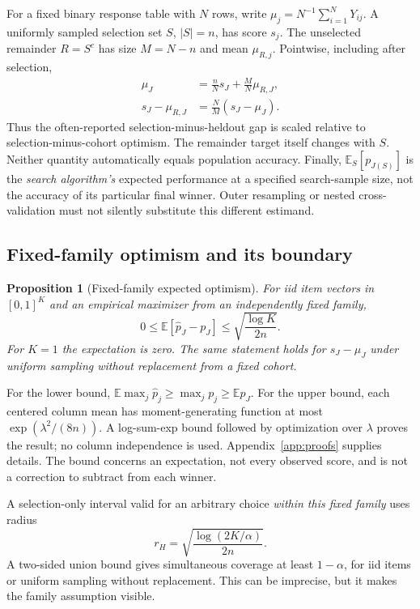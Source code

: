 \documentclass{article}
\newtheorem{proposition}{Proposition}
\newcommand{\E}{\mathbb E}
\begin{document}
For a fixed binary response table with $N$ rows, write $\mu_j=N^{-1}\sum_{i=1}^N Y_{ij}$. A uniformly sampled selection set $S$, $|S|=n$, has score $s_j$. The unselected remainder $R=S^c$ has size $M=N-n$ and mean $\mu_{R,j}$. Pointwise, including after selection,
\begin{align}
 \mu_J&=\frac nN s_J+\frac MN\mu_{R,J},\label{eq:mapping}\\
 s_J-\mu_{R,J}&=\frac NM(s_J-\mu_J).\label{eq:gap}
\end{align}
Thus the often-reported selection-minus-heldout gap is scaled relative to selection-minus-cohort optimism. The remainder target itself changes with $S$. Neither quantity automatically equals population accuracy. Finally, $\E_S[p_{J(S)}]$ is the \emph{search algorithm's} expected performance at a specified search-sample size, not the accuracy of its particular final winner. Outer resampling or nested cross-validation must not silently substitute this different estimand.

\subsection{Fixed-family optimism and its boundary}
\begin{proposition}[Fixed-family expected optimism]\label{prop:optimism}
For iid item vectors in $[0,1]^K$ and an empirical maximizer from an independently fixed family,
\[
0\leq\E[\widehat p_J-p_J]\leq\sqrt{\frac{\log K}{2n}}.
\]
For $K=1$ the expectation is zero. The same statement holds for $s_J-\mu_J$ under uniform sampling without replacement from a fixed cohort.
\end{proposition}
For the lower bound, $\E\max_j\widehat p_j\geq\max_jp_j\geq\E p_J$. For the upper bound, each centered column mean has moment-generating function at most $\exp(\lambda^2/(8n))$. A log-sum-exp bound followed by optimization over $\lambda$ proves the result; no column independence is used. Appendix~\ref{app:proofs} supplies details. The bound concerns an expectation, not every observed score, and is not a correction to subtract from each winner.

A selection-only interval valid for an arbitrary choice \emph{within this fixed family} uses radius
\begin{equation}
 r_H=\sqrt{\frac{\log(2K/\alpha)}{2n}}.\label{eq:hoeffding}
\end{equation}
A two-sided union bound gives simultaneous coverage at least $1-\alpha$, for iid items or uniform sampling without replacement. This can be imprecise, but it makes the family assumption visible.
\end{document}
